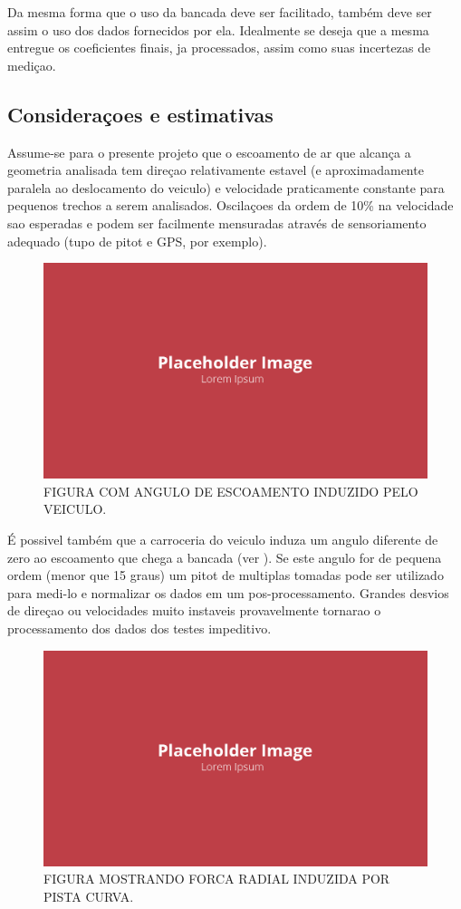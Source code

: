 Da mesma forma que o uso da bancada deve ser facilitado, também deve ser assim o uso dos dados fornecidos por ela. Idealmente se deseja que a mesma entregue os coeficientes finais, ja processados, assim como suas incertezas de mediçao.

\subsection{Consideraçoes e estimativas}

Assume-se para o presente projeto que o escoamento de ar que alcança a geometria analisada tem direçao relativamente estavel (e aproximadamente paralela ao deslocamento do veiculo) e velocidade praticamente constante para pequenos trechos a serem analisados. Oscilaçoes da ordem de 10\% na velocidade sao esperadas e podem ser facilmente mensuradas através de sensoriamento adequado (tupo de pitot e GPS, por exemplo). 

\begin{figure}[!ht]
    \centering
    \includegraphics[width=.8\linewidth]{figuras/placeholder.png}
    \caption{FIGURA COM ANGULO DE ESCOAMENTO INDUZIDO PELO VEICULO\cite{autor}.}
    \label{fig:vehicle-angle}
\end{figure}

É possivel também que a carroceria do veiculo induza um angulo diferente de zero ao escoamento que chega a bancada (ver ). Se este angulo for de pequena ordem (menor que 15 graus) um pitot de multiplas tomadas pode ser utilizado para medi-lo e normalizar os dados em um pos-processamento. Grandes desvios de direçao ou velocidades muito instaveis provavelmente tornarao o processamento dos dados dos testes impeditivo.

\begin{figure}[!ht]
    \centering
    \includegraphics[width=.8\linewidth]{figuras/placeholder.png}
    \caption{FIGURA MOSTRANDO FORCA RADIAL INDUZIDA POR PISTA CURVA\cite{autor}.}
    \label{fig:placeholder}
\end{figure}


